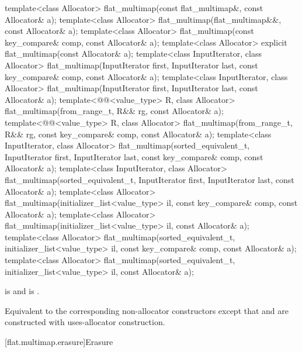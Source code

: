 %
\begin{itemdecl}
template<class Allocator>
  flat_multimap(const flat_multimap&, const Allocator& a);
template<class Allocator>
  flat_multimap(flat_multimap&&, const Allocator& a);
template<class Allocator>
  flat_multimap(const key_compare& comp, const Allocator& a);
template<class Allocator>
  explicit flat_multimap(const Allocator& a);
template<class InputIterator, class Allocator>
  flat_multimap(InputIterator first, InputIterator last, const key_compare& comp,
                const Allocator& a);
template<class InputIterator, class Allocator>
  flat_multimap(InputIterator first, InputIterator last, const Allocator& a);
template<@@<value_type> R, class Allocator>
  flat_multimap(from_range_t, R&& rg, const Allocator& a);
template<@@<value_type> R, class Allocator>
  flat_multimap(from_range_t, R&& rg, const key_compare& comp, const Allocator& a);
template<class InputIterator, class Allocator>
  flat_multimap(sorted_equivalent_t, InputIterator first, InputIterator last,
                const key_compare& comp, const Allocator& a);
template<class InputIterator, class Allocator>
  flat_multimap(sorted_equivalent_t, InputIterator first, InputIterator last,
                const Allocator& a);
template<class Allocator>
  flat_multimap(initializer_list<value_type> il, const key_compare& comp, const Allocator& a);
template<class Allocator>
  flat_multimap(initializer_list<value_type> il, const Allocator& a);
template<class Allocator>
  flat_multimap(sorted_equivalent_t, initializer_list<value_type> il,
                const key_compare& comp, const Allocator& a);
template<class Allocator>
  flat_multimap(sorted_equivalent_t, initializer_list<value_type> il, const Allocator& a);
\end{itemdecl}

\begin{itemdescr}
\pnum
\constraints
{} is  and
 is .

\pnum
\effects
Equivalent to the corresponding non-allocator constructors
except that  and  are constructed
with uses-allocator construction.
\end{itemdescr}

[flat.multimap.erasure]{Erasure}

